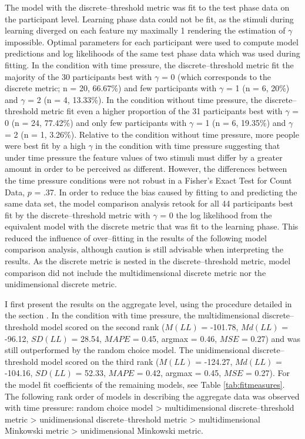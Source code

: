 \documentclass[a4paper,man,natbib]{apa6}
\begin{document}
The model with the discrete--threshold metric was fit to the test phase data on the participant level. Learning phase data could not be fit, as the stimuli during learning diverged on each feature my maximally 1 rendering the estimation of $\gamma$ impossible. Optimal parameters for each participant were used to compute model predictions and log likelihoods of the same test phase data which was used during fitting. In the condition with time pressure, the discrete--threshold metric fit the majority of the 30 participants best with $\gamma$ = 0 (which corresponds to the discrete metric; n = 20, 66.67\%) and few participants with $\gamma$ = 1 (n = 6, 20\%) and $\gamma$ = 2 (n = 4, 13.33\%). In the condition without time pressure, the discrete--threshold metric fit even a higher proportion of the 31 participants best with $\gamma$ = 0 (n = 24, 77.42\%) and only few participants with $\gamma$ = 1 (n = 6, 19.35\%) and $\gamma$ = 2 (n = 1, 3.26\%). Relative to the condition without time pressure, more people were best fit by a high $\gamma$ in the condition with time pressure suggesting that under time pressure the feature values of two stimuli must differ by a greater amount in order to be perceived as different. However, the differences between the time pressure conditions were not robust in a Fisher's Exact Test for Count Data, $p$ = .37. In order to reduce the bias caused by fitting to and predicting the same data set, the model comparison analysis retook for all 44 participants best fit by the discrete--threshold metric with $\gamma$ = 0 the log likelihood from the equivalent model with the discrete metric that was fit to the learning phase. This reduced the influence of over--fitting in the results of the following model comparison analysis, although caution is still advisable when interpreting the results. As the discrete metric is nested in the discrete--threshold metric, model comparison did not include the multidimensional discrete metric nor the unidimensional discrete metric. 

I first present the results on the aggregate level, using the procedure detailed in the section . In the condition with time pressure, the multidimensional discrete--threshold model scored on the second rank ($M(LL)$ = -101.78, $Md(LL)$ = -96.12, $SD(LL)$ = 28.54, $MAPE$ = 0.45, argmax = 0.46, $MSE$ = 0.27) and was still outperformed by the random choice model. The unidimensional discrete--threshold model scored on the third rank ($M(LL)$ = -124.27, $Md(LL)$ = -104.16, $SD(LL)$ = 52.33, $MAPE$ = 0.42, argmax = 0.45, $MSE$ = 0.27). For the model fit coefficients of the remaining models, see Table \ref{tab:fitmeasures}. The following rank order of models in describing the aggregate data was observed with time pressure: random choice model > multidimensional discrete--threshold metric > unidimensional discrete--threshold metric > multidimensional Minkowski metric > unidimensional Minkowski metric.
\end{document}
